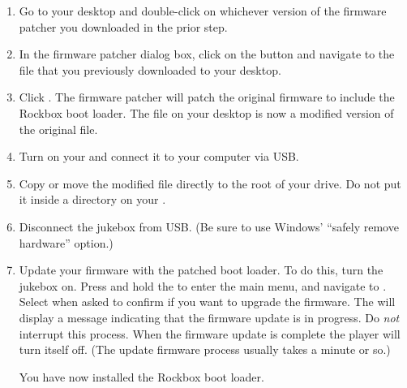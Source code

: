 \begin{enumerate}
{    downloading the alternate firmware patcher , which is 
    built without Unicode support.}
  \item Go to your desktop and double-click on whichever version of the firmware 
  patcher you downloaded in the prior step.
  \item In the firmware patcher dialog box, click on the 
  button and navigate
  to the  file that you previously downloaded to your desktop.
  \item Click . The firmware patcher will patch the
    original firmware to include the Rockbox boot loader. The 
    file on your desktop is now a modified version of the original
     file.
  \item Turn on your \playerman{} and connect it to your computer via USB.
  \item Copy or move the modified  file directly to the root of
    your \daps{} drive. Do not put it inside a directory on your \dap.
  \item Disconnect the jukebox from USB. (Be sure to use Windows' ``safely remove
  hardware'' option.)
  \item Update your \daps{} firmware with the patched boot loader. To do this, turn
    the jukebox on. Press and hold the
    to enter the main menu, and navigate to . Select  when asked to confirm if you want to upgrade the 
    firmware. The \playerman{} will display a message indicating that the
    firmware update 
    is in progress. Do \emph{not} interrupt this process. When the
    firmware update is complete the player will turn itself off. (The update
    firmware process usually takes a minute or so.)
    
    You have now installed the Rockbox boot loader.
\end{enumerate}


